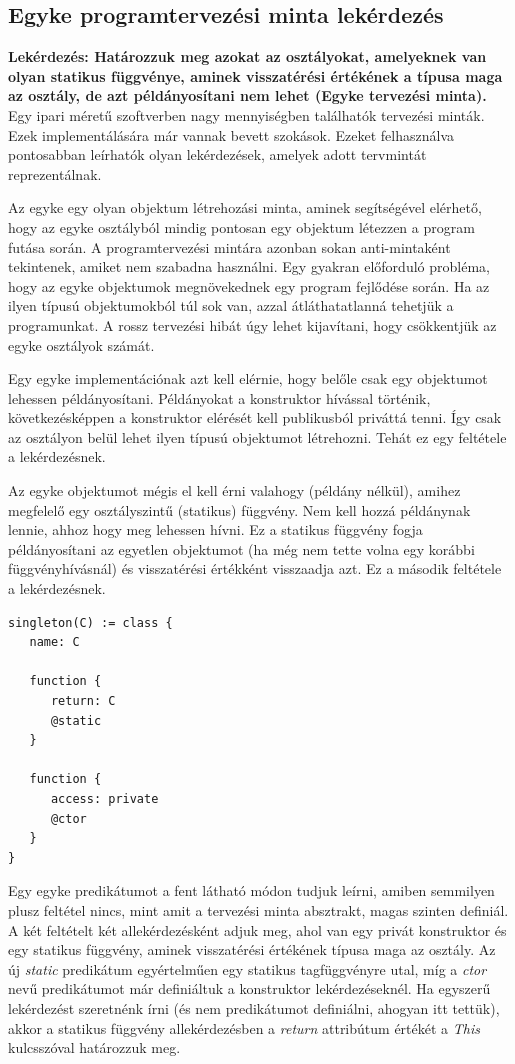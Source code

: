\documentclass[a4paper,12pt]{report}
\begin{document}
\subsection{Egyke programtervezési minta lekérdezés}
\textbf{Lekérdezés: Határozzuk meg azokat az osztályokat, amelyeknek van olyan statikus függvénye, aminek visszatérési értékének a típusa maga az osztály, de azt példányosítani nem lehet (Egyke tervezési minta).}
\\
Egy ipari méretű szoftverben nagy mennyiségben találhatók tervezési minták. Ezek implementálására már vannak bevett szokások. Ezeket felhasználva pontosabban leírhatók olyan lekérdezések, amelyek adott tervmintát reprezentálnak.
\par Az egyke egy olyan objektum létrehozási minta, aminek segítségével elérhető, hogy az egyke osztályból mindig pontosan egy objektum létezzen a program futása során. A programtervezési mintára azonban sokan anti-mintaként tekintenek, amiket nem szabadna használni. Egy gyakran előforduló probléma, hogy az egyke objektumok megnövekednek egy program fejlődése során. Ha az ilyen típusú objektumokból túl sok van, azzal átláthatatlanná tehetjük a programunkat. A rossz tervezési hibát úgy lehet kijavítani, hogy csökkentjük az egyke osztályok számát.
\par Egy egyke implementációnak azt kell elérnie, hogy belőle csak egy objektumot lehessen példányosítani. Példányokat a konstruktor hívással történik, következésképpen a konstruktor elérését kell publikusból priváttá tenni. Így csak az osztályon belül lehet ilyen típusú objektumot létrehozni. Tehát ez egy feltétele a lekérdezésnek.
\par Az egyke objektumot mégis el kell érni valahogy (példány nélkül), amihez megfelelő egy osztályszintű (statikus) függvény. Nem kell hozzá példánynak lennie, ahhoz hogy meg lehessen hívni. Ez a statikus függvény fogja példányosítani az egyetlen objektumot (ha még nem tette volna egy korábbi függvényhívásnál) és visszatérési értékként visszaadja azt. Ez a második feltétele a lekérdezésnek.
\begin{verbatim}
singleton(C) := class {
   name: C
   
   function {
      return: C
      @static
   }

   function {
      access: private 
      @ctor      
   }
}
\end{verbatim}
\par Egy egyke predikátumot a fent látható módon tudjuk leírni, amiben semmilyen plusz feltétel nincs, mint amit a tervezési minta absztrakt, magas szinten definiál. A két feltételt két allekérdezésként adjuk meg, ahol van egy privát konstruktor és egy statikus függvény, aminek visszatérési értékének típusa maga az osztály. Az új \textit{static} predikátum egyértelműen egy statikus tagfüggvényre utal, míg a \textit{ctor} nevű predikátumot már definiáltuk a konstruktor lekérdezéseknél. Ha egyszerű lekérdezést szeretnénk írni (és nem predikátumot definiálni, ahogyan itt tettük), akkor a statikus függvény allekérdezésben a \textit{return} attribútum értékét a \textit{This} kulcsszóval határozzuk meg.
\end{document}
